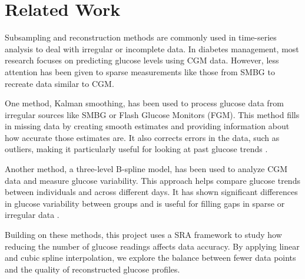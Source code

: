 
\section{Related Work}

Subsampling and reconstruction methods are commonly used in time-series analysis to deal with irregular or incomplete data. In diabetes management, most research focuses on predicting glucose levels using CGM data. However, less attention has been given to sparse measurements like those from SMBG to recreate data similar to CGM.

One method, Kalman smoothing, has been used to process glucose data from irregular sources like SMBG or Flash Glucose Monitors (FGM). This method fills in missing data by creating smooth estimates and providing information about how accurate those estimates are. It also corrects errors in the data, such as outliers, making it particularly useful for looking at past glucose trends \cite{Staal2019}.

Another method, a three-level B-spline model, has been used to analyze CGM data and measure glucose variability. This approach helps compare glucose trends between individuals and across different days. It has shown significant differences in glucose variability between groups and is useful for filling gaps in sparse or irregular data \cite{Zheng2011}.

Building on these methods, this project uses a SRA framework to study how reducing the number of glucose readings affects data accuracy. By applying linear and cubic spline interpolation, we explore the balance between fewer data points and the quality of reconstructed glucose profiles.

